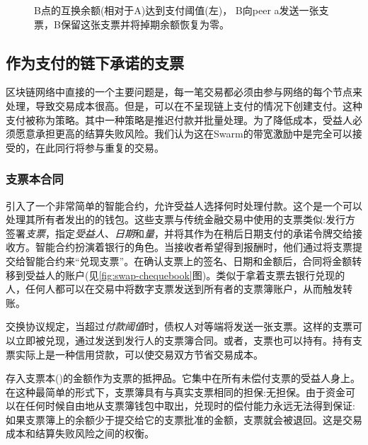 \begin{center}
\begin{figure}[htbp]

\caption[支票交换\statusgreen]{B点的互换余额(相对于A)达到支付阈值(左)，
B向peer a发送一张支票，B保留这张支票并将掉期余额恢复为零。}
\label{fig:chequeswap}
\end{figure}
\end{center}

\subsection{作为支付的链下承诺的支票\statusgreen}\label{sec:cheques}

区块链网络中直接的一个主要问题是，每一笔交易都必须由参与网络的每个节点来处理，导致交易成本很高。但是，可以在不呈现链上支付的情况下创建支付。这种支付被称为策略。其中一种策略是推迟付款并批量处理。为了降低成本，受益人必须愿意承担更高的结算失败风险。我们认为这在Swarm的带宽激励中是完全可以接受的，在此同行将参与重复的交易。


\subsubsection{支票本合同}

\cite{ethersphere2016sw3}引入了一个非常简单的智能合约，允许受益人选择何时处理付款。这个是一个可以处理其所有者发出的的钱包。这些支票与传统金融交易中使用的支票类似:发行方签署\emph{支票}，指定\emph{受益人}、\emph{日期}和\emph{量}，并将其作为在稍后日期支付的承诺令牌交给接收方。智能合约扮演着银行的角色。当接收者希望得到报酬时，他们通过将支票提交给智能合约来“兑现支票”。在确认支票上的签名、日期和金额后，合同将金额转移到受益人的账户(见\ref{fig:swap-chequebook}图)。类似于拿着支票去银行兑现的人，任何人都可以在交易中将数字支票发送到所有者的支票簿账户，从而触发转账。

交换协议规定，当超过\emph{付款阈值}时，债权人对等端将发送一张支票。这样的支票可以立即被兑现，通过发送到发行人的支票簿合同。或者，支票也可以持有。持有支票实际上是一种信用贷款，可以使交易双方节省交易成本。

存入支票本()的金额作为支票的抵押品。它集中在所有未偿付支票的受益人身上。在这种最简单的形式下，支票簿具有与真实支票相同的担保:无担保。由于资金可以在任何时候自由地从支票簿钱包中取出，兑现时的偿付能力永远无法得到保证:如果支票簿上的余额少于提交给它的支票批准的金额，支票就会被退回。这是交易成本和结算失败风险之间的权衡。

